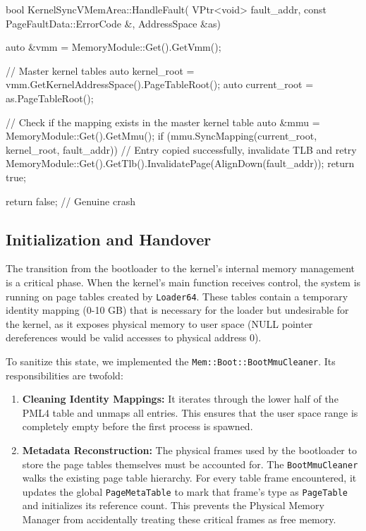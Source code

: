 \documentclass[a4paper,10pt,twoside]{report}
\theoremstyle{definition}
\begin{document}
\begin{cppcode}[caption={Lazy Kernel Synchronization Logic}, label={lst:kernel_sync}]
bool KernelSyncVMemArea::HandleFault(
    VPtr<void> fault_addr, const PageFaultData::ErrorCode &, AddressSpace &as)
{
    auto &vmm = MemoryModule::Get().GetVmm();
    
    // Master kernel tables
    auto kernel_root  = vmm.GetKernelAddressSpace().PageTableRoot();
    auto current_root = as.PageTableRoot();

    // Check if the mapping exists in the master kernel table
    auto &mmu = MemoryModule::Get().GetMmu();
    if (mmu.SyncMapping(current_root, kernel_root, fault_addr)) {
        // Entry copied successfully, invalidate TLB and retry
        MemoryModule::Get().GetTlb().InvalidatePage(AlignDown(fault_addr));
        return true;
    }

    return false; // Genuine crash
}
\end{cppcode}

\subsection{Initialization and Handover}

The transition from the bootloader to the kernel's internal memory management is a critical phase. When the kernel's main function receives control, the system is running on page tables created by \texttt{Loader64}. These tables contain a temporary identity mapping (0-10 GB) that is necessary for the loader but undesirable for the kernel, as it exposes physical memory to user space (NULL pointer dereferences would be valid accesses to physical address 0).

To sanitize this state, we implemented the \texttt{Mem::Boot::BootMmuCleaner}. Its responsibilities are twofold:

\begin{enumerate}
    \item \textbf{Cleaning Identity Mappings:} It iterates through the lower half of the PML4 table and unmaps all entries. This ensures that the user space range is completely empty before the first process is spawned.
    \item \textbf{Metadata Reconstruction:} The physical frames used by the bootloader to store the page tables themselves must be accounted for. The \texttt{BootMmuCleaner} walks the existing page table hierarchy. For every table frame encountered, it updates the global \texttt{PageMetaTable} to mark that frame's type as \texttt{PageTable} and initializes its reference count. This prevents the Physical Memory Manager from accidentally treating these critical frames as free memory.
\end{enumerate}
\end{document}
